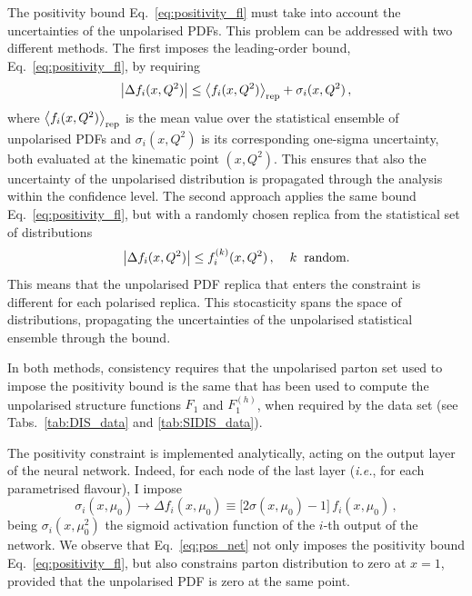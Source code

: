 The positivity bound Eq.~\eqref{eq:positivity_fl} must take into account the uncertainties of the unpolarised PDFs. This problem can be addressed with two different methods. The first imposes the leading-order bound, Eq.~\eqref{eq:positivity_fl}, by requiring
\begin{equation}
  \left| \Delta f_i (x,Q^2) \right| \leq \left<f_i (x,Q^2)\right>_{\textrm{rep}} + \sigma_i(x,Q^2) \,,
  \label{eq:positivity_fl_sigma}
\end{equation}
where $\left<f_i (x,Q^2)\right>_{\textrm{rep}}$ is the mean value over the statistical ensemble of unpolarised PDFs and $\sigma_i(x,Q^2)$ is its corresponding one-sigma uncertainty, both evaluated at the kinematic point $(x,Q^2)$. This ensures that also the uncertainty of the unpolarised distribution is propagated through the analysis within the confidence level. The second approach applies the same bound Eq.~\eqref{eq:positivity_fl}, but with a randomly chosen replica from the statistical set of distributions
%
\begin{equation}
  \left| \Delta f_i (x,Q^2) \right| \leq f_i^{(k)} (x,Q^2)\,, \hspace{4mm} k \hspace{2mm} \textrm{random}.
  \label{eq:positivity_random}
\end{equation}
This means that the unpolarised PDF replica that enters the constraint is different for each polarised replica. This stocasticity spans the space of distributions, propagating the uncertainties of the unpolarised statistical ensemble through the bound.%

In both methods, consistency requires that the unpolarised parton set used to impose the positivity bound is the same that has been used to compute the unpolarised structure functions $F_1$ and $F_1^{(h)}$, when required by the data set (see Tabs.~\ref{tab:DIS_data} and \ref{tab:SIDIS_data}).%

The positivity constraint is implemented analytically, acting on the output layer of the neural network. Indeed, for each node of the last layer (\textit{i.e.}, for each parametrised flavour), I impose
\begin{equation}
  \sigma_{i} (x,\mu_0) \rightarrow \Delta f_{i} (x, \mu_0) \equiv \bigl[ 2 \sigma(x,\mu_0) - 1 \bigr] \, f_{i} (x,\mu_0) \,,
  \label{eq:pos_net}
\end{equation}
being $\sigma_i(x,\mu^2_0)$ the sigmoid activation function of the $i$-th output of the network. We observe that Eq.~\eqref{eq:pos_net} not only imposes the positivity bound Eq.~\eqref{eq:positivity_fl}, but also constrains parton distribution to zero at $x=1$, provided that the unpolarised PDF is zero at the same point. 

